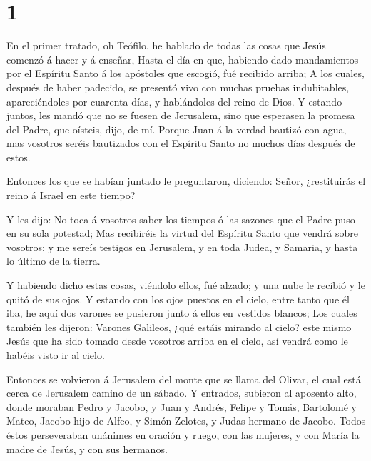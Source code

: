 \hypertarget{section}{%
\section{1}\label{section}}

 En el primer tratado, oh Teófilo, he hablado de todas las
cosas que Jesús comenzó á hacer y á enseñar,  Hasta el día
en que, habiendo dado mandamientos por el Espíritu Santo á los apóstoles
que escogió, fué recibido arriba;  A los cuales, después de
haber padecido, se presentó vivo con muchas pruebas indubitables,
apareciéndoles por cuarenta días, y hablándoles del reino de Dios.
 Y estando juntos, les mandó que no se fuesen de Jerusalem,
sino que esperasen la promesa del Padre, que oísteis, dijo, de mí.
 Porque Juan á la verdad bautizó con agua, mas vosotros
seréis bautizados con el Espíritu Santo no muchos días después de estos.

 Entonces los que se habían juntado le preguntaron,
diciendo: Señor, ¿restituirás el reino á Israel en este tiempo?

 Y les dijo: No toca á vosotros saber los tiempos ó las
sazones que el Padre puso en su sola potestad;  Mas
recibiréis la virtud del Espíritu Santo que vendrá sobre vosotros; y me
sereís testigos en Jerusalem, y en toda Judea, y Samaria, y hasta lo
último de la tierra.

 Y habiendo dicho estas cosas, viéndolo ellos, fué alzado; y
una nube le recibió y le quitó de sus ojos.  Y estando con
los ojos puestos en el cielo, entre tanto que él iba, he aquí dos
varones se pusieron junto á ellos en vestidos blancos;  Los
cuales también les dijeron: Varones Galileos, ¿qué estáis mirando al
cielo? este mismo Jesús que ha sido tomado desde vosotros arriba en el
cielo, así vendrá como le habéis visto ir al cielo.

 Entonces se volvieron á Jerusalem del monte que se llama
del Olivar, el cual está cerca de Jerusalem camino de un sábado.
 Y entrados, subieron al aposento alto, donde moraban Pedro
y Jacobo, y Juan y Andrés, Felipe y Tomás, Bartolomé y Mateo, Jacobo
hijo de Alfeo, y Simón Zelotes, y Judas hermano de Jacobo. 
Todos éstos perseveraban unánimes en oración y ruego, con las mujeres, y
con María la madre de Jesús, y con sus hermanos.

